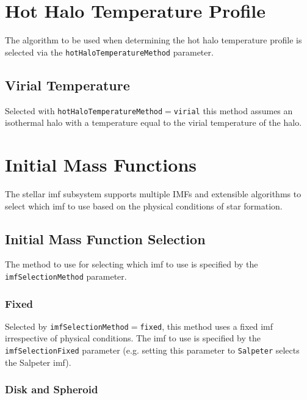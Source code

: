 \section{Hot Halo Temperature Profile}\label{sec:HotHaloTemperature}

The algorithm to be used when determining the hot halo temperature profile is selected via the {\tt hotHaloTemperatureMethod} parameter.

\subsection{Virial Temperature}

Selected with {\tt hotHaloTemperatureMethod}$=${\tt virial} this method assumes an isothermal halo with a temperature equal to the virial temperature of the halo.

\section{Initial Mass Functions}

The stellar \gls{imf} subsystem supports multiple IMFs and extensible algorithms to select which \gls{imf} to use based on the physical conditions of star formation.

\subsection{Initial Mass Function Selection}

The method to use for selecting which \gls{imf} to use is specified by the {\tt imfSelectionMethod} parameter.

\subsubsection{Fixed}

Selected by {\tt imfSelectionMethod}$=${\tt fixed}, this method uses a fixed \gls{imf} irrespective of physical conditions. The \gls{imf} to use is specified by the {\tt imfSelectionFixed} parameter (e.g. setting this parameter to {\tt Salpeter} selects the Salpeter \gls{imf}).

\subsubsection{Disk and Spheroid}

